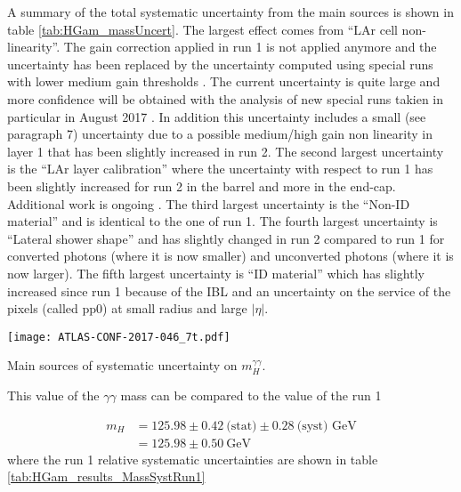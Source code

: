 A summary of the total systematic uncertainty from the main sources is shown in table \ref{tab:HGam_massUncert}.
The largest effect comes from ``LAr cell non-linearity''.
The gain correction applied in run 1 is not applied anymore \cite{ATL-COM-PHYS-2017-758} and the uncertainty has been replaced by the uncertainty computed using special runs with lower medium gain thresholds \cite{Unal_20170427}.
The current uncertainty is quite large and more confidence will be obtained with the analysis of new special runs takien in particular in August 2017 \cite{Unal_20170622,170830_Unal}.
In addition this uncertainty includes a small (see \cite{ATL-COM-PHYS-2013-1423} paragraph 7) uncertainty due to a possible medium/high gain non linearity in layer 1 that has been slightly increased in run 2.
The second largest uncertainty is the ``LAr layer calibration'' \cite{ATL-COM-PHYS-2013-1423} where the uncertainty with respect to run 1 has been slightly increased for run 2 in the barrel and more in the end-cap.
Additional work is ongoing \cite{ATL-COM-PHYS-2017-760}.
The third largest uncertainty is the ``Non-ID material'' and is identical to the one of run 1.
The fourth largest uncertainty is ``Lateral shower shape'' and has slightly changed in run 2 compared to run 1 \cite{CERN-PH-EP-2014-153,ATL-COM-PHYS-2017-758} for converted photons (where it is now smaller) and unconverted photons (where it is now larger).
The fifth largest uncertainty is ``ID material'' which has slightly increased since run 1 \cite{ATL-COM-PHYS-2017-759} because of the IBL and an uncertainty on the service of the pixels (called pp0) at small radius and large $|\eta|$.
\begin{table}
  \centering
  \texttt{[image: ATLAS-CONF-2017-046\_7t.pdf]}
  \caption{Main sources of systematic uncertainty on $m_H^{\gamma\gamma}$. \cite{ATLAS-CONF-2017-046}}
  \label{tab:HGam_massUncert}
\end{table}



This value of the $\gamma\gamma$ mass can be compared to the value of the run 1 \cite{CERN-PH-EP-2014-122}

\begin{align*}
  m_H &= 125.98 \pm 0.42\ \text{(stat)} \pm 0.28 \ \text{(syst) GeV}\\
  &= 125.98 \pm  0.50 \ \text{GeV}
\end{align*}
where the run 1 relative systematic uncertainties are shown in table \ref{tab:HGam_results_MassSystRun1}

